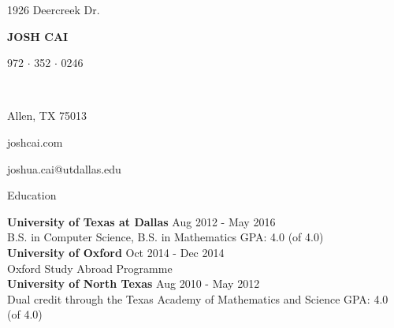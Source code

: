 \documentclass{resume} %
\newcommand\textbox[1]{%
  \parbox{.333\textwidth}{#1}%
}
\begin{document}
\noindent\textbox{1926 Deercreek Dr.\hfill}\textbox{\hfil {\MakeUppercase{\namesize\bf Josh Cai}}\hfil}\textbox{\hfill 972 $\cdot$ 352 $\cdot$ 0246}\\
\noindent\textbox{Allen, TX 75013\hfill}\textbox{\hfil joshcai.com\hfil}\textbox{\hfill joshua.cai@utdallas.edu}\medskip



\begin{rSection}{Education}

{\bf University of Texas at Dallas} \hfill Aug 2012 - May 2016 \\
B.S. in Computer Science, B.S. in Mathematics \hfill GPA: 4.0 (of 4.0)\smallskip \\
{\bf University of Oxford} \hfill Oct 2014 - Dec 2014 \\
Oxford Study Abroad Programme\smallskip \\
{\bf University of North Texas} \hfill Aug 2010 - May 2012 \\
Dual credit through the Texas Academy of Mathematics and Science \hfill GPA: 4.0 (of 4.0)

\end{rSection}

\end{document}
